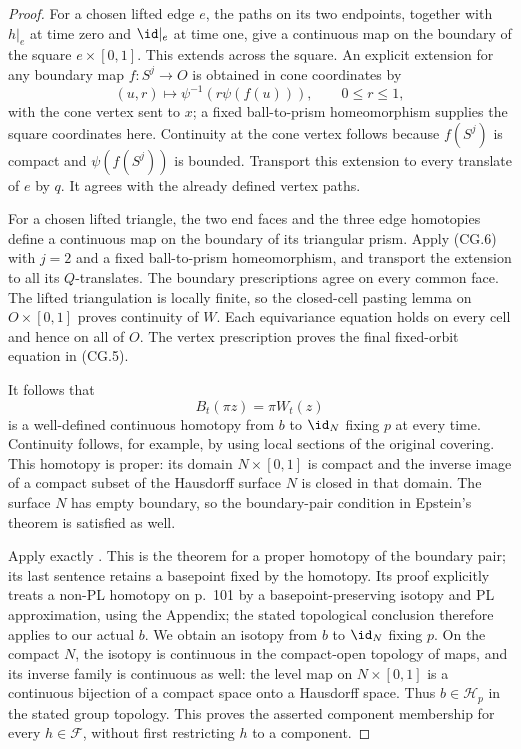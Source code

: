 \begin{proof}
For a chosen lifted edge $e$, the paths on its two endpoints,
together with $h|_e$ at time zero and $\id|_e$ at time one,
give a continuous map on the boundary of the square
$e\times[0,1]$.  This extends across the square.
An explicit extension for any boundary map $f:S^j\to O$
is obtained in cone coordinates by
\[
       (u,r)\longmapsto\psi^{-1}(r\psi(f(u))),
       \qquad 0\leq r\leq1,                                  \tag{CG.6}
\]
with the cone vertex sent to $x$; a fixed ball-to-prism
homeomorphism supplies the square coordinates here.
Continuity at the cone vertex follows because $f(S^j)$
is compact and $\psi(f(S^j))$ is bounded.
Transport this extension to every translate of $e$ by $q$.
It agrees with the already defined vertex paths.

For a chosen lifted triangle, the two end faces and the
three edge homotopies define a continuous map on the
boundary of its triangular prism.  Apply (CG.6) with
$j=2$ and a fixed ball-to-prism homeomorphism, and transport
the extension to all its $Q$-translates.
The boundary prescriptions agree on every common face.
The lifted triangulation is locally finite, so the closed-cell
pasting lemma on $O\times[0,1]$ proves continuity of $W$.
Each equivariance equation holds on every cell and hence
on all of $O$.  The vertex prescription proves the final
fixed-orbit equation in (CG.5).

It follows that
\[
             B_t(\pi z)=\pi W_t(z)                            \tag{CG.7}
\]
is a well-defined continuous homotopy from $b$ to $\id_N$
fixing $p$ at every time.  Continuity follows, for example,
by using local sections of the original covering.
This homotopy is proper: its domain $N\times[0,1]$ is
compact and the inverse image of a compact subset of
the Hausdorff surface $N$ is closed in that domain.
The surface $N$ has empty boundary, so the boundary-pair
condition in Epstein's theorem is satisfied as well.

Apply exactly \cite[Theorem~6.3, p.~99; proof, pp.~100--101]
{C_Epstein1966}.  This is the theorem for a proper homotopy
of the boundary pair; its last sentence retains a basepoint
fixed by the homotopy.  Its proof explicitly treats a
non-PL homotopy on p.~101 by a basepoint-preserving isotopy
and PL approximation, using the Appendix; the stated
topological conclusion therefore applies to our actual $b$.
We obtain an isotopy from $b$ to $\id_N$ fixing $p$.
On the compact $N$, the isotopy is continuous in the
compact-open topology of maps, and its inverse family is
continuous as well: the level map on $N\times[0,1]$ is
a continuous bijection of a compact space onto a Hausdorff
space.  Thus $b\in\mathscr H_p$ in the stated group topology.
This proves the asserted component membership for every
$h\in\mathscr F$, without first restricting $h$ to a component.


\end{proof}
